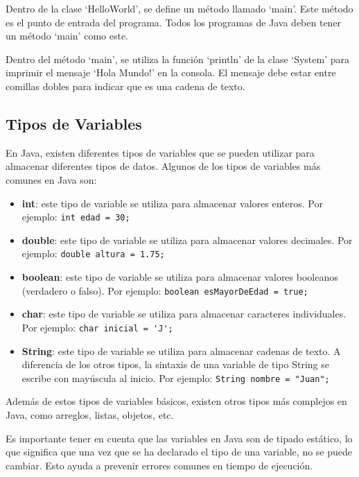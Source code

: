 \documentclass[executivepaper]{article}
\begin{document}
    Dentro de la clase \enquote*{HelloWorld}, se define un método llamado \enquote*{main}. Este método es el punto de entrada del programa. Todos los programas de Java deben tener un método \enquote*{main} como este.

    Dentro del método \enquote*{main}, se utiliza la función \enquote*{println} de la clase \enquote*{System} para imprimir el mensaje \enquote*{Hola Mundo!} en la consola. El mensaje debe estar entre comillas dobles para indicar que es una cadena de texto.

\subsection{Tipos de Variables}

En Java, existen diferentes tipos de variables que se pueden utilizar para almacenar diferentes tipos de datos. Algunos de los tipos de variables más comunes en Java son:

\begin{itemize}
\item \textbf{int}: este tipo de variable se utiliza para almacenar valores enteros. Por ejemplo: \lstinline{int edad = 30;}
\item \textbf{double}: este tipo de variable se utiliza para almacenar valores decimales. Por ejemplo: \lstinline{double altura = 1.75;}
\item \textbf{boolean}: este tipo de variable se utiliza para almacenar valores booleanos (verdadero o falso). Por ejemplo: \lstinline{boolean esMayorDeEdad = true;}
\item \textbf{char}: este tipo de variable se utiliza para almacenar caracteres individuales. Por ejemplo: \lstinline{char inicial = 'J';}
\item \textbf{String}: este tipo de variable se utiliza para almacenar cadenas de texto. A diferencia de los otros tipos, la sintaxis de una variable de tipo String se escribe con mayúscula al inicio. Por ejemplo: \lstinline{String nombre = "Juan";}
\end{itemize}

Además de estos tipos de variables básicos, existen otros tipos más complejos en Java, como arreglos, listas, objetos, etc.

Es importante tener en cuenta que las variables en Java son de tipado estático, lo que significa que una vez que se ha declarado el tipo de una variable, no se puede cambiar. Esto ayuda a prevenir errores comunes en tiempo de ejecución.
\end{document}
